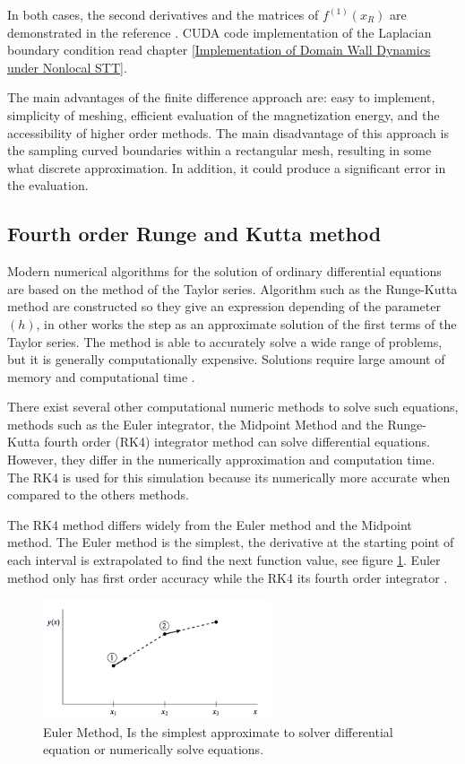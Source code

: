 In both cases, the second derivatives and the matrices of $f^{(1)}(x_R)$ are demonstrated in the reference \cite{methods}. CUDA code implementation of the Laplacian boundary condition read chapter \ref{Implementation of Domain Wall Dynamics under Nonlocal STT}.

The main advantages of the finite difference approach are: easy to implement, simplicity of meshing, efficient evaluation of the magnetization energy, and the accessibility of higher order methods. The main disadvantage of this approach is the sampling curved boundaries within a rectangular mesh, resulting in some what discrete approximation. In addition, it could produce a significant error in the evaluation.

\subsection{Fourth order Runge and Kutta method}

 Modern numerical algorithms for the solution of ordinary differential equations are based on the method of the Taylor series. Algorithm such as the Runge-Kutta method are constructed so they give an expression depending of the parameter $(h)$, in other works the step as an approximate solution of the first terms of the Taylor series. The method is able to accurately solve a wide range of problems, but it is generally computationally expensive. Solutions require large amount of memory and computational time \cite{numerical}.

There exist several other computational numeric methods to solve such equations, methods such as the Euler integrator, the Midpoint Method and the Runge-Kutta fourth order (RK4) integrator method can solve differential equations. However, they differ in the numerically approximation and computation time. The RK4 is used for this simulation because its numerically more accurate when compared to the others methods.

The RK4 method differs widely from the Euler method and the Midpoint method. The Euler method is the simplest, the derivative at the starting point of each interval is extrapolated to find the next function value, see figure \ref{fig:euler}. Euler method only has first order accuracy while the RK4 its fourth order integrator \cite{numerical}.

\begin{figure}[htbp]
	\centering
		\includegraphics[width=0.6\textwidth]{Figures/euler.png}
		\smallskip
	\caption[Euler Method]{Euler Method, Is the simplest approximate to solver differential equation or numerically solve equations.}
	\label{fig:euler}
\end{figure}

